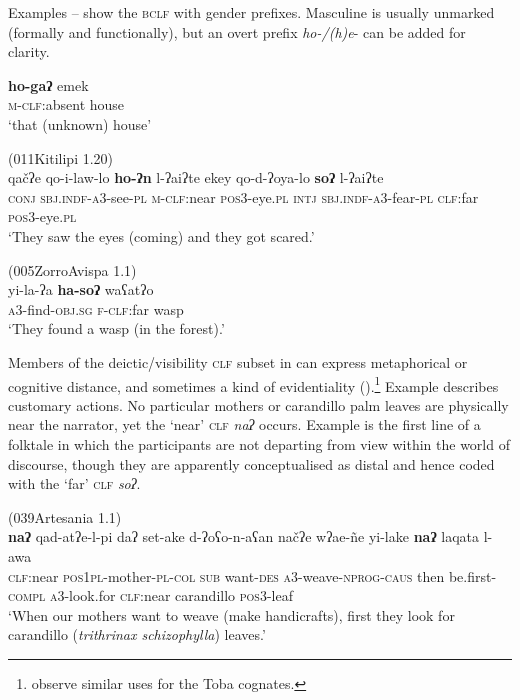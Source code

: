 \documentclass[output=paper,colorlinks,citecolor=brown]{langscibook}
\begin{document}
Examples – show the \textsc{bclf} with gender prefixes. Masculine is usually unmarked (formally and functionally), but an overt prefix \textit{ho-/(h)e}- can be added for clarity.

\ea\label{ex:payne:9}
\gll  \textbf{ho-gaʔ}  emek\\
\textsc{m-clf}:absent  house\\
\glt ‘that (unknown) house’
\z

\ea\label{ex:payne:10} (011Kitilipi 1.20)\\
\gll  qačʔe  qo-i-law-lo    \textbf{ho-ʔn}  l-ʔaiʔte  ekey qo-d-ʔoya-lo    \textbf{soʔ}  l-ʔaiʔte\\
\textsc{conj}   \textsc{sbj.indf-a3}-see-\textsc{pl}  \textsc{m-clf}:near  \textsc{pos3}-eye.\textsc{pl} \textsc{intj} \textsc{sbj.indf-a3}-fear-\textsc{pl}  \textsc{clf}:far  \textsc{pos3}-eye.\textsc{pl}\\
\glt ‘They saw the eyes (coming) and they got scared.’ 
\z

\ea\label{ex:payne:11} (005ZorroAvispa 1.1)\\
\gll  yi-la-ʔa  \textbf{ha-soʔ}  waʕatʔo\\
\textsc{a3}-find-\textsc{obj.sg}    \textsc{f-clf}:far    wasp\\
\glt ‘They found a wasp (in the forest).’ 
\z

Members of the deictic/visibility \textsc{clf} subset in  can express metaphorical or cognitive distance, and sometimes a kind of evidentiality ().\footnote{\citet{MessineoEtAl2016} observe similar uses for the Toba cognates.} Example  describes customary actions. No particular mothers or carandillo palm leaves are physically near the narrator, yet the ‘near’ \textsc{clf} \textit{naʔ} occurs. Example  is the first line of a folktale in which the participants are not departing from view within the world of discourse, though they are apparently conceptualised as distal and hence coded with the ‘far’ \textsc{clf} \textit{soʔ}.


\ea\label{ex:payne:12} (039Artesania 1.1)\\
\gll  \textbf{naʔ}  qad-atʔe-l-pi  daʔ  set-ake  d-ʔoʕo-n-aʕan načʔe  wʔae-ñe  yi-lake  \textbf{naʔ}  laqata  l-awa\\
\textsc{clf}:near  \textsc{pos1pl}-mother-\textsc{pl-col} \textsc{sub}  want-\textsc{des}  \textsc{a3}-weave-\textsc{nprog-caus} then be.first-\textsc{compl}  \textsc{a3}-look.for  \textsc{clf}:near  carandillo  \textsc{pos3}-leaf\\
\glt ‘When our mothers want to weave (make handicrafts), first they look for carandillo (\textit{trithrinax schizophylla}) leaves.’ 
\z
\end{document}
